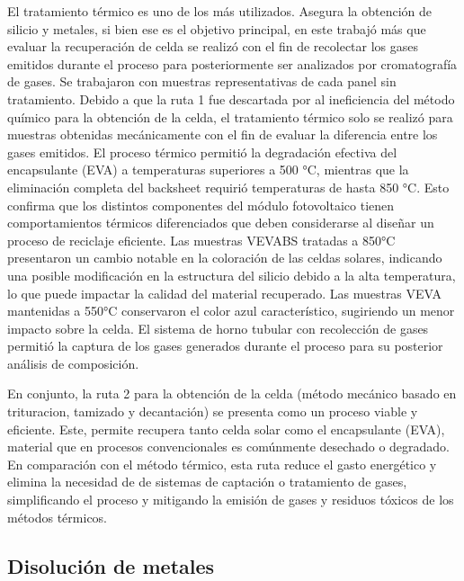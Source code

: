  El tratamiento térmico es uno de los más utilizados. Asegura la obtención de silicio y metales, si bien ese es el objetivo principal, en este trabajó más que evaluar la recuperación de celda se realizó con el fin de recolectar los gases emitidos durante el proceso para posteriormente ser analizados por cromatografía de gases. Se trabajaron con muestras representativas de cada panel sin tratamiento. Debido a que la ruta 1 fue descartada por al ineficiencia del método químico para la obtención de la celda, el tratamiento térmico solo se realizó para muestras obtenidas mecánicamente con el fin de evaluar la diferencia entre los gases emitidos. 
 El proceso térmico permitió la degradación efectiva del encapsulante (EVA) a temperaturas superiores a 500 °C, mientras que la eliminación completa del backsheet requirió temperaturas de hasta 850 °C. Esto confirma que los distintos componentes del módulo fotovoltaico tienen comportamientos térmicos diferenciados que deben considerarse al diseñar un proceso de reciclaje eficiente.  
 Las muestras VEVABS tratadas a 850°C presentaron un cambio notable en la coloración de las celdas solares, indicando una posible modificación en la estructura del silicio debido a la alta temperatura, lo que puede impactar la calidad del material recuperado. Las muestras VEVA mantenidas a 550°C conservaron el color azul característico, sugiriendo un menor impacto sobre la celda.
 El sistema de horno tubular con recolección de gases permitió la captura de los gases generados durante el proceso para su posterior análisis de composición. 
 
 
 En conjunto, la ruta 2 para la obtención de la celda (método mecánico basado en trituracion, tamizado y decantación) se presenta como un proceso viable y eficiente. Este, permite recupera tanto celda solar como el encapsulante (EVA), material que en procesos convencionales es comúnmente desechado o degradado. En comparación con el método térmico, esta ruta reduce el gasto energético y elimina la necesidad de de sistemas de captación o tratamiento de gases, simplificando el proceso y mitigando la emisión de gases y residuos tóxicos de los métodos térmicos. 
 
 \subsection{Disolución de metales}
 \label{subsec:Conclusiones disolución de metales}
 
